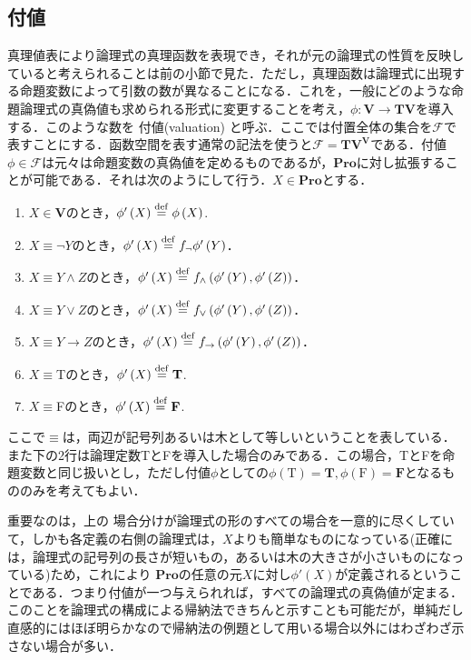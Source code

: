 \documentclass{ltjsarticle}
\theoremstyle{mystyle1}
\theoremstyle{mystyle3}
\theoremstyle{mystyle2}
\newcommand{\bT}{\ensuremath{\mathbf{T}}}
\newcommand{\bF}{\ensuremath{\mathbf{F}}}
\newcommand{\bV}{\ensuremath{\mathbf{V}}}
\newcommand{\bPro}{\ensuremath{\mathbf{Pro}}}
\newcommand{\cF}{\ensuremath{\mathcal{F}}}
\newcommand{\dequal}{\ensuremath{\stackrel{\rm{def}}{=}}}
\newcommand{\red}[1]{{\color{red} #1}}
\begin{document}
\subsection{付値}
真理値表により論理式の真理函数を表現でき，それが元の論理式の性質を反映していると考えられることは前の小節で見た．ただし，真理函数は論理式に出現する命題変数によって引数の数が異なることになる．これを，一般にどのような命題論理式の真偽値も求められる形式に変更することを考え，$\phi:\bV\to\bT\bV$を導入する．このような数を\red{付値}(valuation) と呼ぶ．ここでは付置全体の集合を$\cF$で表すことにする．函数空間を表す通常の記法を使うと$\cF=\bT\bV^\bV$である．付値$\phi\in\cF$は元々は命題変数の真偽値を定めるものであるが，$\bPro$に対し拡張することが可能である．それは次のようにして行う．$X\in\bPro$とする．\begin{enumerate}
  \item $X\in\bV$のとき，$\phi'\left(X\right)\dequal\phi\left(X\right)$.
  \item $X\equiv\neg Y$のとき，$\phi'\left(X\right)\dequal f_\neg\phi'\left(Y\right)$．
  \item $X\equiv Y\wedge Z$のとき，$\phi'\left(X\right)\dequal f_\wedge\left(\phi'\left(Y\right),\phi'\left(Z\right)\right)$．
  \item $X\equiv Y\vee Z$のとき，$\phi'\left(X\right)\dequal f_\vee\left(\phi'\left(Y\right),\phi'\left(Z\right)\right)$．
  \item $X\equiv Y\to Z$のとき，$\phi'\left(X\right)\dequal f_\to\left(\phi'\left(Y\right),\phi'\left(Z\right)\right)$．
  \item $X\equiv$Tのとき，$\phi'\left(X\right)\dequal\bT$.
  \item $X\equiv$Fのとき，$\phi'\left(X\right)\dequal\bF$.
\end{enumerate}
ここで$\equiv$は，両辺が記号列あるいは木として等しいということを表している．また下の2行は論理定数TとFを導入した場合のみである．この場合，TとFを命題変数と同じ扱いとし，ただし付値$\phi$としての$\phi\left(\mathrm{T}\right)=\bT,\phi\left(\mathrm{F}\right)=\bF$となるもののみを考えてもよい．

重要なのは，上の\red{場合分けが論理式の形のすべての場合を一意的に尽くしていて，しかも各定義の右側の論理式は，$X$よりも簡単なものになっている}(正確には，論理式の記号列の長さが短いもの，あるいは木の大きさが小さいものになっている)ため，これにより\red{$\bPro$の任意の元$X$に対し$\phi'\left(X\right)$が定義}されるということである．つまり付値が一つ与えられれば，すべての論理式の真偽値が定まる．このことを論理式の構成による帰納法できちんと示すことも可能だが，単純だし直感的にはほぼ明らかなので帰納法の例題として用いる場合以外にはわざわざ示さない場合が多い．
\end{document}
